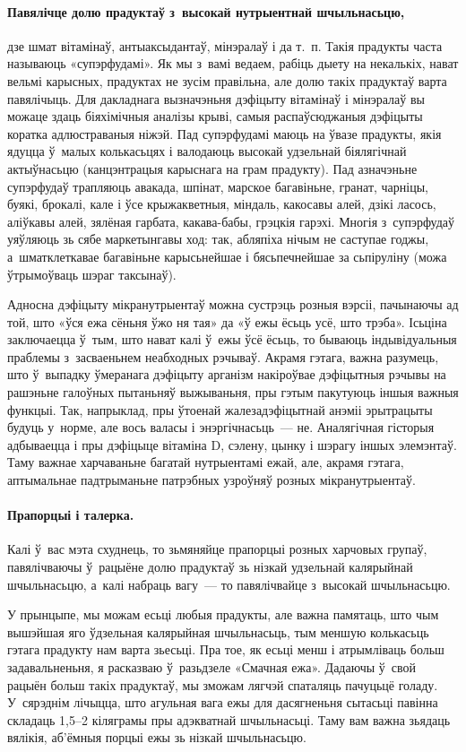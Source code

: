 \paragraph{Павялічце долю прадуктаў з~высокай нутрыентнай шчыльнасьцю,} дзе шмат вітамінаў, антыаксыдантаў, мінэралаў і да т.~п. Такія прадукты часта называюць «супэрфудамі». Як мы з~вамі ведаем, рабіць дыету на некалькіх, нават вельмі карысных, прадуктах не зусім правільна, але долю такіх прадуктаў варта павялічыць. Для дакладнага вызначэньня дэфіцыту вітамінаў і мінэралаў вы можаце здаць біяхімічныя аналізы крыві, самыя распаўсюджаныя дэфіцыты коратка адлюстраваныя ніжэй. Пад супэрфудамі маюць на ўвазе прадукты, якія ядуцца ў~малых колькасьцях і валодаюць высокай удзельнай біялягічнай актыўнасьцю (канцэнтрацыя карыснага на грам прадукту). Пад азначэньне супэрфудаў трапляюць авакада, шпінат, марское багавіньне, гранат, чарніцы, буякі, брокалі, кале і ўсе крыжакветныя, міндаль, какосавы алей, дзікі ласось, аліўкавы алей, зялёная гарбата, какава-бабы, грэцкія гарэхі. Многія з~супэрфудаў уяўляюць зь сябе маркетынгавы ход: так, абляпіха нічым не саступае годжы, а~шматклеткавае багавіньне карысьнейшае і бясьпечнейшае за сьпіруліну (можа ўтрымоўваць шэраг таксынаў).

Адносна дэфіцыту мікранутрыентаў можна сустрэць розныя вэрсіі, пачынаючы ад той, што «ўся ежа сёньня ўжо ня тая» да «ў ежы ёсьць усё, што трэба». Ісьціна заключаецца ў~тым, што нават калі ў~ежы ўсё ёсьць, то бываюць індывідуальныя праблемы з~засваеньнем неабходных рэчываў. Акрамя гэтага, важна разумець, што ў~выпадку ўмеранага дэфіцыту арганізм накіроўвае дэфіцытныя рэчывы на рашэньне галоўных пытаньняў выжываньня, пры гэтым пакутуюць іншыя важныя функцыі. Так, напрыклад, пры ўтоенай жалезадэфіцытнай анэміі эрытрацыты будуць у~норме, але вось валасы і энэргічнасьць~--- не. Аналягічная гісторыя адбываецца і пры дэфіцыце вітаміна D, сэлену, цынку і шэрагу іншых элемэнтаў. Таму важнае харчаваньне багатай нутрыентамі ежай, але, акрамя гэтага, аптымальнае падтрыманьне патрэбных узроўняў розных мікранутрыентаў.

\paragraph{Прапорцыі і талерка.}
Калі ў~вас мэта схуднець, то зьмяняйце прапорцыі розных харчовых групаў, павялічваючы ў~рацыёне долю прадуктаў зь нізкай удзельнай калярыйнай шчыльнасьцю, а~калі набраць вагу~--- то павялічвайце з~высокай шчыльнасьцю.

У прынцыпе, мы можам есьці любыя прадукты, але важна памятаць, што чым вышэйшая яго ўдзельная калярыйная шчыльнасьць, тым меншую колькасьць гэтага прадукту нам варта зьесьці. Пра тое, як есьці менш і атрымліваць больш задавальненьня, я расказваю ў~разьдзеле «Смачная ежа». Дадаючы ў~свой рацыён больш такіх прадуктаў, мы зможам лягчэй спаталяць пачуцьцё голаду. У~сярэднім лічыцца, што агульная вага ежы для дасягненьня сытасьці павінна складаць 1,5--2 кіляграмы пры адэкватнай шчыльнасьці. Таму вам важна зьядаць вялікія, аб'ёмныя порцыі ежы зь нізкай шчыльнасьцю.

